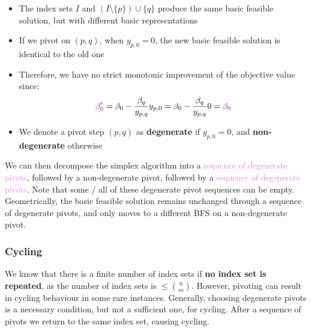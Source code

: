 \documentclass[a4paper, 12pt]{article}
\newcommand{\violet}[1]{\textcolor{violet}{#1}}
\begin{document}
                \begin{itemize}
                    \itemsep0em
                    \item The index sets $I$ and $(I \setminus \{p\}) \cup \{q\}$ produce the same basic feasible solution, but with different basic representations
                    \item If we pivot on $(p, q)$, when $y_{p, 0} = 0$, the new basic feasible solution is identical to the old one
                    \item Therefore, we have no strict monotonic improvement of the objective value since;
                        $$\violet{\beta^\prime_0} = \beta_0 - \frac{\beta_q}{y_{p, q}}y_{p, 0} = \beta_0 - \frac{\beta_q}{y_{p, q}}0 = \violet{\beta_0}$$
                    \item We denote a pivot step $(p, q)$ as \textbf{degenerate} if $y_{p, 0} = 0$, and \textbf{non-degenerate} otherwise
                \end{itemize}
                We can then decompose the simplex algorithm into a \violet{sequence of degenerate pivots}, followed by a non-degenerate pivot, followed by a \violet{sequence of degenerate pivots}.
                Note that some / all of these degenerate pivot sequences can be empty.
                Geometrically, the basic feasible solution remains unchanged through a sequence of degenerate pivots, and only moves to a different BFS on a non-degenerate pivot.
            \subsubsection*{Cycling}
                We know that there is a finite number of index sets if \textbf{no index set is repeated}, as the number of index sets is $\leq \binom{n}{m}$.
                However, pivoting can result in cycling behaviour in some rare instances.
                Generally, choosing degenerate pivots is a necessary condition, but not a sufficient one, for cycling.
                After a sequence of pivots we return to the same index set, causing cycling.
                \medskip
\end{document}
